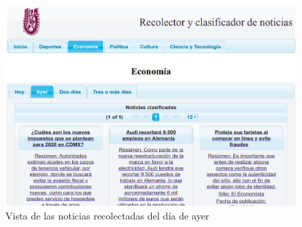 \begin{figure}[H]
\centering
\includegraphics[scale=0.29]{imagenes/Capitulo5/noticiasDeAyer.png}
\caption{Vista de las noticias recolectadas del día de ayer}
\label{fig:vistaNoticiasAyer}
\end{figure}

